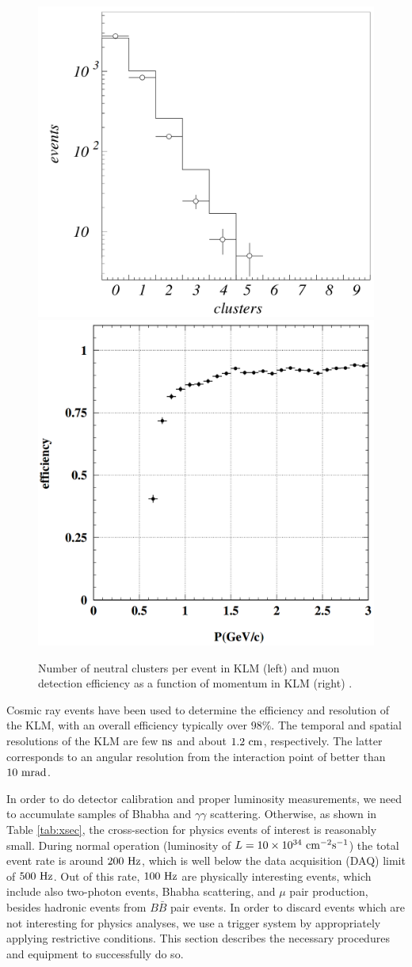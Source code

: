 \begin{figure}[!htb]
	\centering
	\captionsetup{width=0.8\linewidth}
	\includegraphics[width=0.48\linewidth,trim = 0cm -1.5cm 0cm 0cm]{fig/setup/KLM_clusters}
	\includegraphics[width=0.48\linewidth]{fig/setup/KLM_efficiency}
	\caption{Number of neutral clusters per event in KLM (left) and muon detection efficiency as a function of momentum in KLM (right) \cite{ABASHIAN2002117}.}
	\label{fig:KLM_eff}
\end{figure}

Cosmic ray events have been used to determine the efficiency and resolution of the KLM, with an overall efficiency typically over $98\%$. The temporal and spatial resolutions of the KLM are few$\mathrm{~ns}$ and about $1.2\mathrm{~cm}$, respectively. The latter corresponds to an angular resolution from the interaction point of better than $10\mathrm{~mrad}$.

In order to do detector calibration and proper luminosity measurements, we need to accumulate samples of Bhabha and $\gamma\gamma$ scattering. Otherwise, as shown in Table \ref{tab:xsec}, the cross-section for physics events of interest is reasonably small. During normal operation (luminosity of $L = 10\times 10^{34}\mathrm{~cm^{-2}s^{-1}}$) the total event rate is around $200\mathrm{~Hz}$, which is well below the data acquisition (DAQ) limit of $500\mathrm{~Hz}$. Out of this rate, $100\mathrm{~Hz}$ are physically interesting events, which include also two-photon events, Bhabha scattering, and $\mu$ pair production, besides hadronic events from $B \bar B$ pair events. In order to discard events which are not interesting for physics analyses, we use a trigger system by appropriately applying restrictive conditions. This section describes the necessary procedures and equipment to successfully do so.

